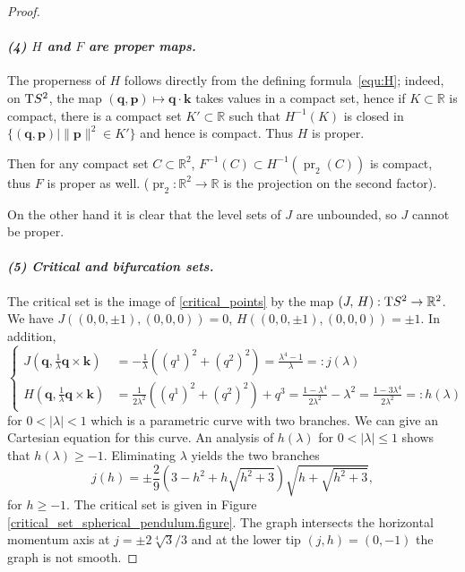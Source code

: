 \documentclass[11pt]{article}
\newcommand{\norm}[1]{\| #1\|}
\newcommand{\RM}{\mathbb{R}}
\renewcommand{\geq}{\geqslant}
\renewcommand{\leq}{\leqslant}
\begin{document}
\begin{proof}
\paragraph{{\em {\rm (4)} $H$ and $F$ are proper maps.}}
The properness of $H$ follows directly from the defining
formula~\eqref{equ:H}; indeed, on ${\rm T}S^2$, the map
$(\mathbf{q},\mathbf{p})\mapsto \mathbf{q}\cdot \mathbf{k}$ takes
values in a compact set, hence if $K\subset\RM$ is compact, there is a
compact set $K'\subset\RM$ such that $H^{-1}(K)$ is closed in
$\{(\mathbf{q},\mathbf{p}) \mid \norm{\mathbf{p}}^2\in K'\}$ and hence
is compact. Thus $H$ is proper.

Then for any compact set $C\subset\RM^2$, $F^{-1}(C)\subset
H^{-1}(\operatorname{pr}_2(C))$ is compact, thus $F$ is proper as
well. ($\operatorname{pr}_2: \mathbb{R}^2\rightarrow \mathbb{R}$ is
the projection on the second factor).

On the other hand it is clear that the level sets of $J$ are
unbounded, so $J$ cannot be proper.
 

\paragraph{{\em {\rm (5)} Critical and bifurcation sets.}} The
critical set is the image of \eqref{critical_points} by the map
$(J,\,H): {\rm T}S^2 \rightarrow \mathbb{R}^2$. We have $J((0,0,\pm
1),(0,0,0))=0$, $H((0,0,\pm 1), (0,0,0)) = \pm 1$.  In addition,
\begin{equation} \nonumber
  \label{parametric_rep_sing_curve}
  \left\{ 
    \begin{aligned}
      J\left(\mathbf{q}, \frac{1}{\lambda} \mathbf{q} \times
        \mathbf{k}\right) & = - \frac{1}{ \lambda}
      \left(\left(q^1\right)^2 + \left(q^2\right)^2 \right)
      = \frac{\lambda^4 - 1}{ \lambda}=:j(\lambda)\\
      H\left(\mathbf{q}, \frac{1}{\lambda} \mathbf{q} \times
        \mathbf{k}\right) & = \frac{1}{2
        \lambda^2}\left(\left(q^1\right)^2 + \left(q^2\right)^2
      \right) + q^3 = \frac{1- \lambda^4}{2 \lambda^2} - \lambda^2=
      \frac{1-3 \lambda^4}{2 \lambda^2}=:h(\lambda)
    \end{aligned}
  \right.
\end{equation} 
for $0<|\lambda|<1$ which is a parametric curve with two branches.  We
can give an Cartesian equation for this curve. An analysis of
$h(\lambda)$ for $0<|\lambda|\leq 1$ shows that $h(\lambda)\geq
-1$. Eliminating $\lambda $ yields the two branches
$$j(h) = \pm
\frac{2}{9} \left(3-h^2 + h\sqrt{h^2+3}\right)\sqrt{h+\sqrt{h^2+3}},
$$
for $h\geq -1$. The critical set is given in Figure
\ref{critical_set_spherical_pendulum.figure}. The graph intersects the
horizontal momentum axis at $j=\pm 2 \sqrt[4]{3}/3$ and at the lower
tip $(j,h)=(0,-1)$ the graph is not smooth.



\end{proof}
\end{document}
